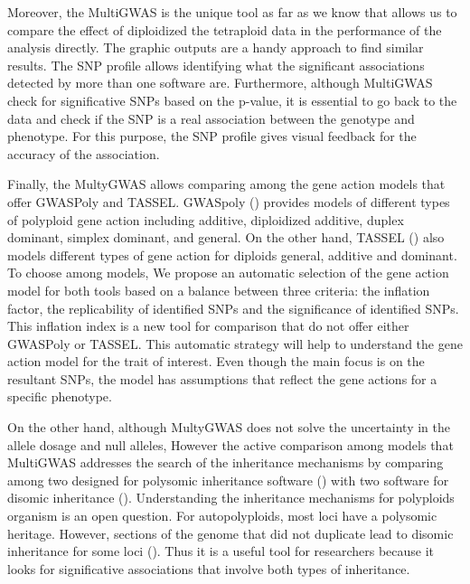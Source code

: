 Moreover, the MultiGWAS is the unique tool as far as we know that allows us to compare the effect of diploidized the tetraploid data in the performance of the analysis directly. The graphic outputs are a handy approach to find similar results. The SNP profile allows identifying what the significant associations detected by more than one software are. Furthermore, although MultiGWAS check for significative SNPs based on the p-value, it is essential to go back to the data and check if the SNP is a real association between the genotype and phenotype. For this purpose, the SNP profile gives visual feedback for the accuracy of the association.



Finally, the MultyGWAS allows comparing among the gene action models that offer GWASPoly and TASSEL.  GWASpoly (\cite{Rosyara2016}) provides models of different types of polyploid gene action including additive, diploidized additive, duplex dominant, simplex dominant, and general. On the other hand, TASSEL (\cite{Bradbury2007}) also models different types of gene action for diploids general, additive and dominant. To choose among models, We propose an automatic selection of the gene action model for both tools based on a balance between three criteria: the inflation factor, the replicability of identified SNPs and the significance of identified SNPs. 
This inflation index is a new tool for comparison that do not offer either GWASPoly or TASSEL. This automatic strategy will help to understand the gene action model for the trait of interest. Even though the main focus is on the resultant SNPs, the model has assumptions that reflect the gene actions for a specific phenotype.

On the other hand, although MultyGWAS does not solve the uncertainty in the allele dosage and null alleles, However the active comparison among models that MultiGWAS addresses the search of the inheritance mechanisms by comparing among two designed for polysomic inheritance software (\cite{Rosyara2016, Shen2016}) with two software for disomic inheritance (\cite{Purcell2007, Bradbury2007}). Understanding the inheritance mechanisms for polyploids organism is an open question. For autopolyploids, most loci have a polysomic heritage. However, sections of the genome that did not duplicate lead to disomic inheritance for some loci (\cite{ohno1970, lynch2000,dufresne2014}). Thus it is a useful tool for researchers because it looks for significative associations that involve both types of inheritance.

